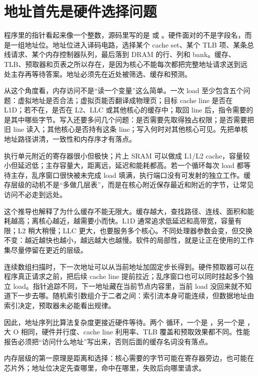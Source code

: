 \section{地址首先是硬件选择问题}

程序里的指针看起来像一个整数，源码里写的是  或 。硬件面对的不是字段名，而是一组地址位。地址位进入译码电路，选择某个 cache set、某个 TLB 项、某条总线请求、某个内存控制器队列，最后落到 DRAM 的行、列和 bank。缓存、TLB、预取器和页表之所以存在，是因为核心不能每次都把完整地址请求送到远处主存再等待答案。地址必须先在近处被筛选、缓存和预测。

从这个角度看，内存访问不是“读一个变量”这么简单。一次 load 至少包含五个问题：虚拟地址是否合法；虚拟页能否翻译成物理页；目标 cache line 是否在 L1D；若不在，是否在 L2、LLC 或其他核心的缓存中；取回 line 后，指令需要的是其中哪些字节。写入还要多问几个问题：是否需要先取得独占权限；是否需要把旧 line 读入；其他核心是否持有这条 line；写入何时对其他核心可见。先把单核地址路径讲清，一致性和内存序才有落点。

执行单元附近的寄存器很小但极快；片上 SRAM 可以做成 L1/L2 cache，容量较小但延迟低；主存容量大，距离远，延迟和能耗都高。若一个循环每次 load 都等待主存，乱序窗口很快被未完成 load 填满，执行端口没有可发射的独立工作。缓存层级的动机不是“多做几层表”，而是在核心附近保存最近和附近的字节，让常见访问不必走到远处。

这个推导也解释了为什么缓存不能无限大。缓存越大，查找路径、连线、面积和能耗越高；离核心越近，越需要小而快。L1D 通常追求低延迟和高带宽，容量有限；L2 稍大稍慢；LLC 更大，也要服务多个核心。不同处理器参数会变，但交换不变：越近越快也越小，越远越大也越慢。软件的局部性，就是让正在使用的工作集尽量停留在更近的层级。

连续数组扫描时，下一次地址可以从当前地址加固定步长得到。硬件预取器可以在程序真正请求之前，把后续 cache line 提前拉近；乱序窗口也可以同时挂起多个独立 load。指针追踪不同，下一地址藏在当前节点内容里，当前 load 没回来就不知道下一步去哪。随机索引数组介于二者之间：索引流本身可能连续，但数据地址由索引决定，预取器未必能看出规律。

因此，地址序列比算法复杂度更接近硬件等待。两个  循环，一个是 ，另一个是 ，大 O 相同，硬件并行度、cache line 利用率、TLB 覆盖和预取效果都不同。性能报告必须把“访问什么地址”写出来，否则后面的缓存名词没有落点。

\begin{keyidea}
内存层级的第一原理是距离和选择：核心需要的字节可能在寄存器旁边，也可能在芯片外；地址位决定先查哪里，命中在哪里，失败后向哪里请求。
\end{keyidea}

